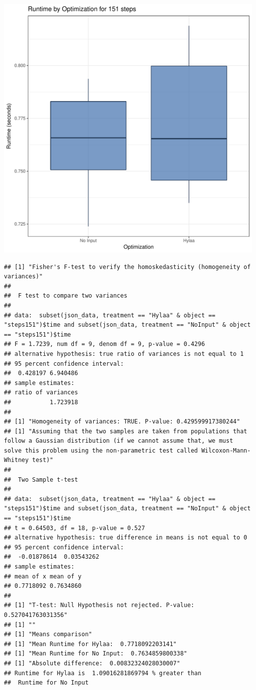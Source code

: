 \documentclass{article}\usepackage[]{graphicx}\usepackage[]{color}
\makeatletter
\def\maxwidth{ %
  \ifdim\Gin@nat@width>\linewidth
    \linewidth
  \else
    \Gin@nat@width
  \fi
}
\newenvironment{kframe}{%
 \def\at@end@of@kframe{}%
 \ifinner\ifhmode%
  \def\at@end@of@kframe{\end{minipage}}%
  \begin{minipage}{\columnwidth}%
 \fi\fi%
 \def\FrameCommand##1{\hskip\@totalleftmargin \hskip-\fboxsep
 \colorbox{shadecolor}{##1}\hskip-\fboxsep
     \hskip-\linewidth \hskip-\@totalleftmargin \hskip\columnwidth}%
 \MakeFramed {\advance\hsize-\width
   \@totalleftmargin\z@ \linewidth\hsize
   \@setminipage}}%
 {\par\unskip\endMakeFramed%
 \at@end@of@kframe}
\newenvironment{knitrout}{}{} %
\makeatother
\begin{document}
\begin{knitrout}
\color{fgcolor}
\includegraphics[width=\maxwidth]{figure/RH4_steps151-1} 
\begin{kframe}\begin{verbatim}
## [1] "Fisher's F-test to verify the homoskedasticity (homogeneity of variances)"
## 
## 	F test to compare two variances
## 
## data:  subset(json_data, treatment == "Hylaa" & object == "steps151")$time and subset(json_data, treatment == "NoInput" & object == "steps151")$time
## F = 1.7239, num df = 9, denom df = 9, p-value = 0.4296
## alternative hypothesis: true ratio of variances is not equal to 1
## 95 percent confidence interval:
##  0.428197 6.940486
## sample estimates:
## ratio of variances 
##           1.723918 
## 
## [1] "Homogeneity of variances: TRUE. P-value: 0.429599917380244"
## [1] "Assuming that the two samples are taken from populations that follow a Gaussian distribution (if we cannot assume that, we must solve this problem using the non-parametric test called Wilcoxon-Mann-Whitney test)"
## 
## 	Two Sample t-test
## 
## data:  subset(json_data, treatment == "Hylaa" & object == "steps151")$time and subset(json_data, treatment == "NoInput" & object == "steps151")$time
## t = 0.64503, df = 18, p-value = 0.527
## alternative hypothesis: true difference in means is not equal to 0
## 95 percent confidence interval:
##  -0.01878614  0.03543262
## sample estimates:
## mean of x mean of y 
## 0.7718092 0.7634860 
## 
## [1] "T-test: Null Hypothesis not rejected. P-value: 0.527041763031356"
## [1] ""
## [1] "Means comparison"
## [1] "Mean Runtime for Hylaa:  0.7718092203141"
## [1] "Mean Runtime for No Input:  0.7634859800338"
## [1] "Absolute difference:  0.00832324028030007"
## Runtime for Hylaa is  1.09016281869794 % greater than 
##  Runtime for No Input
\end{verbatim}
\end{kframe}
\end{knitrout}
\end{document}
